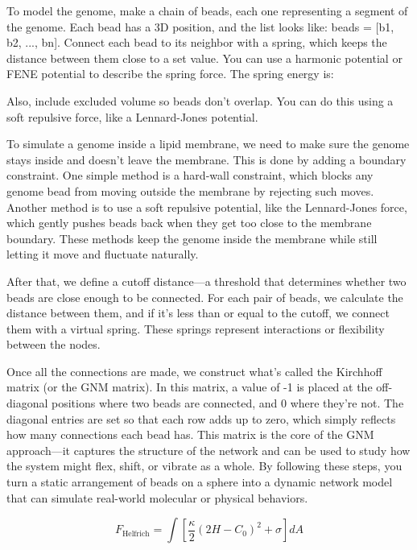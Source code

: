 \documentclass[12pt]{article}
\begin{document}
\begin{flushleft}
To model the genome, make a chain of beads, each one representing a segment of the genome. Each bead has a 3D position, and the list looks like: beads = [b1, b2, ..., bn]. Connect each bead to its neighbor with a spring, which keeps the distance between them close to a set value. You can use a harmonic potential or FENE potential to describe the spring force. The spring energy is:






Also, include excluded volume so beads don’t overlap. You can do this using a soft repulsive force, like a Lennard-Jones potential.


To simulate a genome inside a lipid membrane, we need to make sure the genome stays inside and doesn’t leave the membrane. This is done by adding a boundary constraint. One simple method is a hard-wall constraint, which blocks any genome bead from moving outside the membrane by rejecting such moves. Another method is to use a soft repulsive potential, like the Lennard-Jones force, which gently pushes beads back when they get too close to the membrane boundary. These methods keep the genome inside the membrane while still letting it move and fluctuate naturally.


 
 
 
 
  After that, we define a cutoff distance—a threshold that determines whether two beads are close enough to be connected. For each pair of beads, we calculate the distance between them, and if it’s less than or equal to the cutoff, we connect them with a virtual spring. These springs represent interactions or flexibility between the nodes. 
  
	Once all the connections are made, we construct what's called the Kirchhoff matrix (or the GNM matrix). In this matrix, a value of -1 is placed at the off-diagonal positions where two beads are connected, and 0 where they're not. The diagonal entries are set so that each row adds up to zero, which simply reflects how many connections each bead has. This matrix is the core of the GNM approach—it captures the structure of the network and can be used to study how the system might flex, shift, or vibrate as a whole. By following these steps, you turn a static arrangement of beads on a sphere into a dynamic network model that can simulate real-world molecular or physical behaviors.



\begin{equation}
F_{\text{Helfrich}} = \int \left[ \frac{\kappa}{2} (2H - C_0)^2 + \sigma \right] dA
\end{equation}











\end{flushleft}
\end{document}
